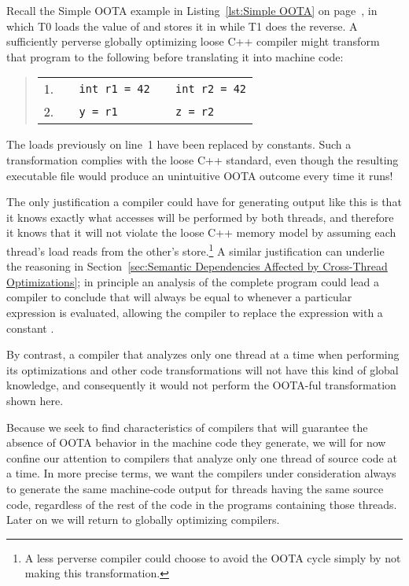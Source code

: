Recall the Simple OOTA example in Listing~\ref{lst:Simple OOTA} on
page~\pageref{lst:Simple OOTA},
in which T0 loads the value of  and stores it in  while T1
does the reverse.
A sufficiently perverse globally optimizing loose C++ compiler might
transform that program to the following before translating it into
machine code:
\begin{quote}
\small
\begin{tabular}{r|l|l}
1. &
\texttt{~~int r1 = 42} &
	\texttt{~~int r2 = 42} \\
2. &
\texttt{~~y = r1} &
	\texttt{~~z = r2} \\
\end{tabular}
\end{quote}
The loads previously on line~1 have been replaced by constants.
Such a transformation complies with the loose C++ standard,
even though the resulting executable file would produce an unintuitive
OOTA outcome every time it runs!

The only justification a compiler could have for generating output like
this is that it knows exactly what accesses will be performed by both
threads, and therefore it knows that it will not violate the loose C++
memory model by assuming each thread's load reads from the other's
store.\footnote{
	A less perverse compiler could choose to avoid the
	OOTA cycle simply by not making this transformation.}
A similar justification can underlie the reasoning in
Section~\ref{sec:Semantic Dependencies Affected by Cross-Thread Optimizations};
in principle an analysis of the complete program could lead a compiler
to conclude that  will always be equal to  whenever a
particular  expression is evaluated, allowing the compiler
to replace the expression with a constant .

By contrast, a compiler that analyzes only one thread at a time when
performing its optimizations and other code transformations will not
have this kind of global knowledge, and consequently it would not
perform the OOTA-ful transformation shown here.

Because we seek to find characteristics of compilers that will
guarantee the absence of OOTA behavior in the machine code they generate,
we will for now confine our attention to compilers that analyze only
one thread of source code at a time.
In more precise terms, we want the compilers under consideration
always to generate the same machine-code output for threads having
the same source code, regardless of the rest of the code in the programs
containing those threads.
Later on we will return to globally optimizing compilers.

